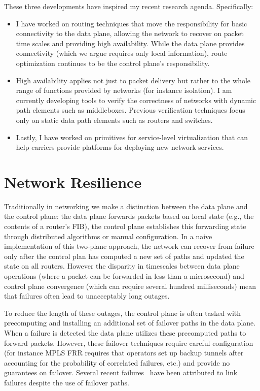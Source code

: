 \documentclass[letterpaper]{article}
\begin{document}
These three developments have inspired my recent research agenda. Specifically:
\begin{itemize}
    \item I have worked on routing techniques that move the responsibility for basic connectivity to the data plane,
        allowing the network to recover on packet time scales and providing high availability. While the data plane
        provides connectivity (which we argue requires only local information), route optimization continues to be the
        control plane's responsibility.
    \item High availability applies not just to packet delivery but rather to the whole range of functions provided by
        networks (for instance isolation). I am currently developing tools to verify the correctness of networks with
        dynamic path elements such as middleboxes. Previous verification techniques focus only on static data path
        elements such as routers and switches.
    \item Lastly, I have worked on primitives for service-level virtualization that can help carriers provide platforms
        for deploying new network services.
\end{itemize}

\section*{Network Resilience}
Traditionally in networking we make a distinction between the data plane and the control plane: the data plane forwards
packets based on local state (e.g., the contents of a router's FIB), the control plane establishes this forwarding state
through distributed algorithms or manual configuration. In a naive implementation of this two-plane approach, the
network can recover from failure only after the control plan has computed a new set of paths and updated the state on
all routers. However the disparity in timescales between data plane operations (where a packet can be forwarded in less
than a microsecond) and control plane convergence (which can require several hundred milliseconds) mean that failures
often lead to unacceptably long outages.

To reduce the length of these outages, the control plane is often tasked with precomputing and installing an additional
set of failover paths in the data plane. When a failure is detected the data plane utilizes these precomputed paths to
forward packets. However, these failover techniques require careful configuration (for instance MPLS FRR requires that
operators set up backup tunnels after accounting for the probability of correlated failures, etc.) and provide no
guarantees on failover. Several recent failures~\cite{sprint2006, emea2008, wiki2012} have been attributed to link
failures despite the use of failover paths. 
\end{document}
